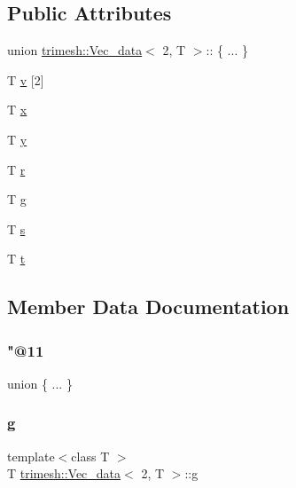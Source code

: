 \subsection*{Public Attributes}
\begin{DoxyCompactItemize}
\item 
union \hyperlink{structtrimesh_1_1Vec__data}{trimesh\+::\+Vec\+\_\+data}$<$ 2, T $>$\+:: \{ ... \}  
\item 
T \hyperlink{structtrimesh_1_1Vec__data_3_012_00_01T_01_4_a394fc35e00f449d849b05104f0276410}{v} \mbox{[}2\mbox{]}
\item 
T \hyperlink{structtrimesh_1_1Vec__data_3_012_00_01T_01_4_a516ae4d9b86b177b40f1f530d748fe3a}{x}
\item 
T \hyperlink{structtrimesh_1_1Vec__data_3_012_00_01T_01_4_a73ece1743d38b3798f51a30d7b86ae1b}{y}
\item 
T \hyperlink{structtrimesh_1_1Vec__data_3_012_00_01T_01_4_a267be51bf86367895cb47b60dcbbc201}{r}
\item 
T \hyperlink{structtrimesh_1_1Vec__data_3_012_00_01T_01_4_abd16421dd04ddc1b394f7dce4b89c2f7}{g}
\item 
T \hyperlink{structtrimesh_1_1Vec__data_3_012_00_01T_01_4_ab8c0f16ab79d13d335654e65aecd03f9}{s}
\item 
T \hyperlink{structtrimesh_1_1Vec__data_3_012_00_01T_01_4_a992bd618f23f3dc81303705c00a76e77}{t}
\end{DoxyCompactItemize}


\subsection{Member Data Documentation}
\mbox{\label{structtrimesh_1_1Vec__data_3_012_00_01T_01_4_a7d088373341f8d0ed86d9ef36f44c971}} 
\subsubsection{\texorpdfstring{"@11}{@11}}
{\footnotesize\ttfamily union \{ ... \} }

\mbox{\label{structtrimesh_1_1Vec__data_3_012_00_01T_01_4_abd16421dd04ddc1b394f7dce4b89c2f7}} 
\subsubsection{\texorpdfstring{g}{g}}
{\footnotesize\ttfamily template$<$class T $>$ \\
T \hyperlink{structtrimesh_1_1Vec__data}{trimesh\+::\+Vec\+\_\+data}$<$ 2, T $>$\+::g}

